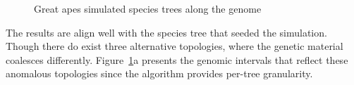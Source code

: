 \documentclass{article}
\begin{document}
\begin{figure}[H]
\begin{minipage}{.9\textwidth}
\begin{minipage}{.24\textwidth}
            \begin{subfigure}[b]{\linewidth}
                \centering
                
            \end{subfigure}
        \end{minipage}
        \begin{minipage}{.24\textwidth}
            \begin{subfigure}[b]{\linewidth}
                \centering
                
            \end{subfigure}
        \end{minipage}
        \begin{minipage}{.24\textwidth}
            \begin{subfigure}[b]{\linewidth}
                \centering
                
            \end{subfigure}
        \end{minipage}
        \begin{minipage}{.24\textwidth}
            \begin{subfigure}[b]{\linewidth}
                \centering
                
            \end{subfigure}
        \end{minipage}
    \end{minipage}
    \caption{Great apes simulated species trees along the genome}\label{fig:great_apes}
\end{figure}

The results are align well with the species tree that seeded the
simulation. Though there do exist three alternative topologies, where the
genetic material coalesces differently. Figure~\ref{fig:great_apes}a presents
the genomic intervals that reflect these anomalous topologies since the algorithm
provides per-tree granularity.
\end{document}
